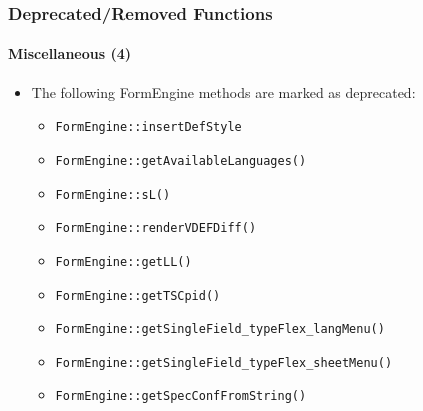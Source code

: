 \begin{frame}[fragile]
	\frametitle{Deprecated/Removed Functions}
	\framesubtitle{Miscellaneous (4)}

	\begin{itemize}
		\item The following FormEngine methods are marked as deprecated:
		\begin{itemize}
			\item \texttt{FormEngine::insertDefStyle}
			\item \texttt{FormEngine::getAvailableLanguages()}
			\item \texttt{FormEngine::sL()}
			\item \texttt{FormEngine::renderVDEFDiff()}
			\item \texttt{FormEngine::getLL()}
 			\item \texttt{FormEngine::getTSCpid()}
 			\item \texttt{FormEngine::getSingleField\_typeFlex\_langMenu()}
 			\item \texttt{FormEngine::getSingleField\_typeFlex\_sheetMenu()}
 			\item \texttt{FormEngine::getSpecConfFromString()}
 		\end{itemize}
	\end{itemize}

\end{frame}

